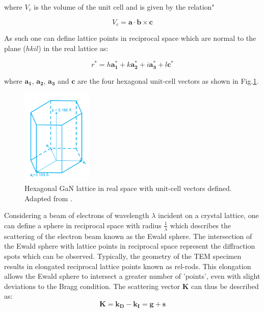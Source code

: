 where $V_{c}$ is the volume of the unit cell and is given by the relation"

\begin{equation}
V_{c} = \mathbf{a} \cdot \mathbf{b} \times \mathbf{c}
\end{equation}

As such one can define lattice points in reciprocal space which are normal to the plane ($hkil$) in the real lattice as:

\begin{equation}
r^{*} = h\mathbf{a^{*}_{1}} + k\mathbf{a^{*}_{2}} + i\mathbf{a^{*}_{3}} + l\mathbf{c^{*}}
\end{equation}

where $\mathbf{a_{1}}$, $\mathbf{a_{2}}$, $\mathbf{a_{3}}$ and $\mathbf{c}$ are the four hexagonal unit-cell vectors as shown in Fig.\ref{2.13}.

\begin{figure}[!ht]
	\centering
	\includegraphics[width=0.3\textwidth]{Figs/Ch2/unitcell.png}
	\caption[h] {Hexagonal GaN lattice in real space with unit-cell vectors defined. Adapted from \cite{Zhang2008}.}
	\label{2.13}
\end{figure}
\FloatBarrier

Considering a beam of electrons of wavelength $\lambda$ incident on a crystal lattice, one can define a sphere in reciprocal space with radius $\frac{1}{\lambda}$ which describes the scattering of the electron beam known as the Ewald sphere. The intersection of the Ewald sphere with lattice points in reciprocal space represent the diffraction spots which can be observed. Typically, the geometry of the TEM specimen results in elongated reciprocal lattice points known as rel-rods. This elongation allows the Ewald sphere to intersect a greater number of 'points', even with slight deviations to the Bragg condition. The scattering vector $\mathbf{K}$ can thus be described as:
\begin{equation}
\mathbf{K} = \mathbf{k_{D}} - \mathbf{k_{I}} = \mathbf{g} + \mathbf{s}
\end{equation}


